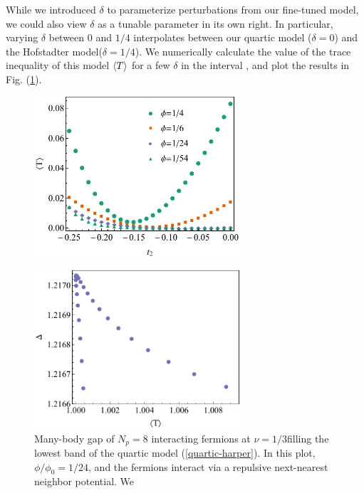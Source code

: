 \documentclass[aps,prb,twocolumn,letterpaper,twoside,nobalancelastpage,groupedaddress,amsmath,amssymb,floatfix,citeautoscript]{revtex4-1}
\begin{document}



While we introduced $\delta$ to parameterize perturbations from our fine-tuned model, we could also view $\delta$ as a tunable parameter in its own right. In particular, varying $\delta$ between $0$ and $1/4$ interpolates between our quartic model ($\delta=0$) and the Hofstadter model($\delta=1/4$). We numerically calculate the value of the trace inequality of this model $\expval{T}$ for a few $\delta$ in the interval  , and plot the results in Fig. (\ref{trace-delta-plot}). 

\begin{figure}[thb]
\centering
\includegraphics[width=3.0in]{trace-delta-plot-new.pdf}
\caption{\label{trace-delta-plot}}
\end{figure}

\begin{figure}[thb]
\centering
\includegraphics[width=3.0in]{gap-v-trace-delta.pdf}
\caption{\label{gap-v-trace-delta-plot}Many-body gap of $N_p=8$ interacting fermions at $\nu=1/3 $filling the lowest band of the quartic model (\ref{quartic-harper}). In this plot, $\phi/\phi_0=1/24$, and the fermions interact via a repulsive next-nearest neighbor potential. We }
\end{figure}
\end{document}
